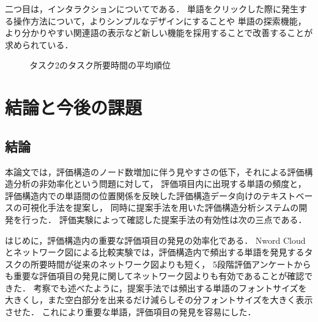 \documentclass[syuuron]{kuee}
\begin{document}
		二つ目は，インタラクションについてである．
		単語をクリックした際に発生する操作方法について，よりシンプルなデザインにすることや
		単語の探索機能，より分かりやすい関連語の表示など新しい機能を採用することで改善することが求められている．
		
		\begin{figure}
			\begin{center}
			\end{center}
			\caption{タスク2のタスク所要時間の平均順位}
	  		\label{fig:res10}
		\end{figure}

\chapter{結論と今後の課題}
	\section{結論}
		本論文では，評価構造のノード数増加に伴う見やすさの低下，それによる評価構造分析の非効率化という問題に対して，
		評価項目内に出現する単語の頻度と，評価構造内での単語間の位置関係を反映した評価構造データ向けのテキストベースの可視化手法を提案し，
		同時に提案手法を用いた評価構造分析システムの開発を行った．
		評価実験によって確認した提案手法の有効性は次の三点である．
		
		はじめに，評価構造内の重要な評価項目の発見の効率化である．
		Nword Cloudとネットワーク図による比較実験では，評価構造内で頻出する単語を発見するタスクの所要時間が従来のネットワーク図よりも短く，
		5段階評価アンケートからも重要な評価項目の発見に関してネットワーク図よりも有効であることが確認できた．
		考察でも述べたように，提案手法では頻出する単語のフォントサイズを大きくし，また空白部分を出来るだけ減らしその分フォントサイズを大きく表示させた．
		これにより重要な単語，評価項目の発見を容易にした．
		
\end{document}
